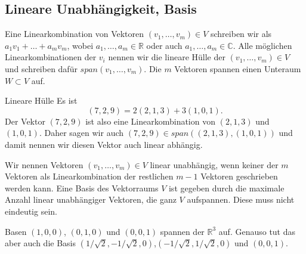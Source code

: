\subsection{Lineare Unabhängigkeit, Basis}
Eine Linearkombination von Vektoren $(v_1,\dots,v_m)\in V$ schreiben wir als
$a_1v_1+\dots+a_mv_m$, wobei $a_1,\dots,a_m\in\mathbb{R}$ oder auch
$a_1,\dots,a_m\in\mathbb{C}$. Alle möglichen Linearkombinationen der $v_i$
nennen wir die lineare Hülle der $(v_1,\dots,v_m)\in V$ und schreiben dafür
$span(v_1,\dots,v_m)$. Die $m$ Vektoren spannen einen Unteraum $W\subset V$
auf.
\begin{example}{Lineare Hülle}
Es ist
\[(7,2,9)=2(2,1,3)+3(1,0,1). \]
Der Vektor $(7,2,9)$ ist also eine Linearkombination von $(2,1,3)$ und
$(1,0,1)$.  Daher sagen wir auch $(7,2,9)\in span\left( (2,1,3),(1,0,1)
\right)$ und damit nennen wir diesen Vektor auch linear abhängig.
\end{example}
Wir nennen Vektoren $(v_1,\dots,v_m)\in V$ linear unabhängig, wenn keiner der
$m$ Vektoren als Linearkombination der restlichen $m-1$ Vektoren geschrieben
werden kann. Eine Basis des Vektorraums $V$ ist gegeben durch die maximale
Anzahl linear unabhängiger Vektoren, die ganz $V$ aufspannen. Diese muss nicht
eindeutig sein.
\begin{example}{Basen}
  $(1,0,0)$, $(0,1,0)$ und $(0,0,1)$ spannen der $\mathbb{R}^3$ auf. Genauso
  tut das aber auch die Basis
  $(1/\sqrt{2},-1/\sqrt{2},0)$,$(-1/\sqrt{2},1/\sqrt{2},0)$ und $(0,0,1)$.
\end{example}
